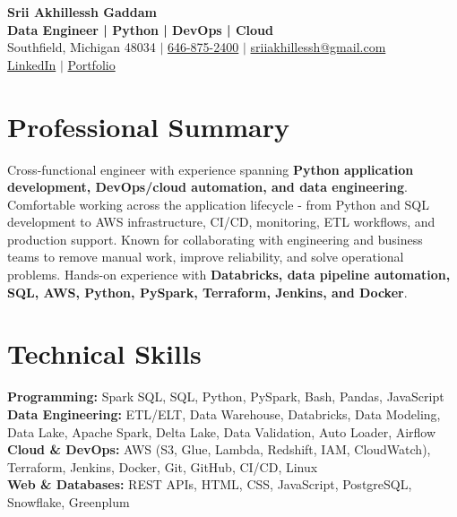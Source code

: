 \documentclass[letterpaper,10pt]{article}
\begin{document}
\fontsize{9.35pt}{10.45pt}\selectfont

\begin{center}
    {\LARGE \textbf{Srii Akhillessh Gaddam}} \\[-1pt]
    \textbf{Data Engineer | Python | DevOps | Cloud} \\[2pt]
    Southfield, Michigan 48034 $|$
    \href{tel:6468752400}{646-875-2400} $|$
    \href{mailto:sriiakhillessh@gmail.com}{sriiakhillessh@gmail.com} \\[1pt]
    \href{https://www.linkedin.com/in/srii-akhiilessh-gaddam-b48668191/}{LinkedIn} $|$
    \href{https://sriiakhillesshg.github.io/portfolio/}{Portfolio}
\end{center}
\vspace{-8pt}

\section{Professional Summary}
\small{Cross-functional engineer with experience spanning \textbf{Python application development, DevOps/cloud automation, and data engineering}. Comfortable working across the application lifecycle - from Python and SQL development to AWS infrastructure, CI/CD, monitoring, ETL workflows, and production support. Known for collaborating with engineering and business teams to remove manual work, improve reliability, and solve operational problems. Hands-on experience with \textbf{Databricks, data pipeline automation, SQL, AWS, Python, PySpark, Terraform, Jenkins, and Docker}.}

\section{Technical Skills}
\small{
\textbf{Programming:} Spark SQL, SQL, Python, PySpark, Bash, Pandas, JavaScript \\
\textbf{Data Engineering:} ETL/ELT, Data Warehouse, Databricks, Data Modeling, Data Lake, Apache Spark, Delta Lake, Data Validation, Auto Loader, Airflow \\
\textbf{Cloud \& DevOps:} AWS (S3, Glue, Lambda, Redshift, IAM, CloudWatch), Terraform, Jenkins, Docker, Git, GitHub, CI/CD, Linux \\
\textbf{Web \& Databases:} REST APIs, HTML, CSS, JavaScript, PostgreSQL, Snowflake, Greenplum
}
\end{document}
